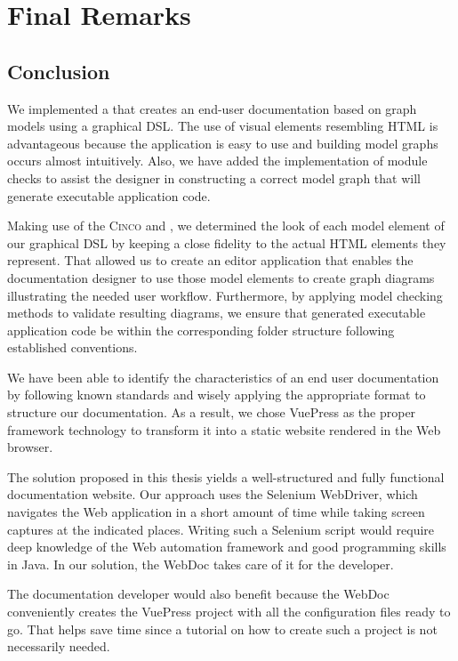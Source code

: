 \chapter{Final Remarks}\label{ch:epilogue}

\section{Conclusion}\label{sec:concl}

We implemented a  that creates an end-user documentation based on graph models using a graphical DSL\@. The use of visual elements resembling HTML is advantageous because the application is easy to use and building model graphs occurs almost intuitively. Also, we have added the implementation of module checks to assist the designer in constructing a correct model graph that will generate executable application code.

Making use of the \textsc{Cinco}  and , we determined the look of each model element of our graphical DSL by keeping a close fidelity to the actual HTML elements they represent. That allowed us to create an editor application that enables the documentation designer to use those model elements to create graph diagrams illustrating the needed user workflow. Furthermore, by applying model checking methods to validate resulting diagrams, we ensure that generated executable application code be within the corresponding folder structure following established conventions.

We have been able to identify the characteristics of an end user documentation by following known standards and wisely applying the appropriate format to structure our documentation. As a result, we chose VuePress as the proper framework technology to transform it into a static website rendered in the Web browser.

The solution proposed in this thesis yields a well-structured and fully functional documentation website. Our approach uses the Selenium WebDriver, which navigates the Web application in a short amount of time while taking screen captures at the indicated places. Writing such a Selenium script would require deep knowledge of the Web automation framework and good programming skills in Java. In our solution, the WebDoc takes care of it for the developer.

The documentation developer would also benefit because the WebDoc conveniently creates the VuePress project with all the configuration files ready to go. That helps save time since a tutorial on how to create such a project is not necessarily needed.


